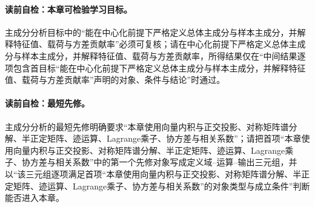 
\label{struct:V4-C04-CH01}
\paragraph{读前自检：本章可检验学习目标。}主成分分析目标中的“能在中心化前提下严格定义总体主成分与样本主成分，并解释特征值、载荷与方差贡献率”必须可复核；请在中心化前提下严格定义总体主成分与样本主成分，并解释特征值、载荷与方差贡献率，所得结果仅在“中间结果逐项包含首目标“能在中心化前提下严格定义总体主成分与样本主成分，并解释特征值、载荷与方差贡献率”声明的对象、条件与结论”时通过。\par


\label{struct:V4-C04-CH02}
\paragraph{读前自检：最短先修。}主成分分析的最短先修明确要求“本章使用向量内积与正交投影、对称矩阵谱分解、半正定矩阵、迹运算、Lagrange乘子、协方差与相关系数”；请把首项“本章使用向量内积与正交投影、对称矩阵谱分解、半正定矩阵、迹运算、Lagrange乘子、协方差与相关系数”中的第一个先修对象写成定义域--运算--输出三元组，并以“该三元组逐项满足首项“本章使用向量内积与正交投影、对称矩阵谱分解、半正定矩阵、迹运算、Lagrange乘子、协方差与相关系数”的对象类型与成立条件”判断能否进入本章。\par

